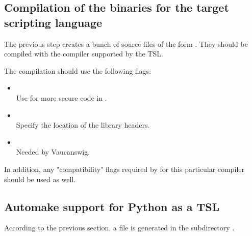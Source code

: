 \subsection{Compilation of the binaries for the target scripting language}

The previous step creates a bunch of \Cxx source files of the form
. They should be compiled with the
\Cxx compiler supported by the TSL.

The \Cxx compilation should use the following flags:

\begin{itemize}
\item {}\\
  Use for more secure code in \Vauc.

\item {}\\
  Specify the location of the \Vauc library headers.

\item {}\\
  Needed by Vaucanswig.
\end{itemize}

In addition, any "compatibility" flags required by \Vauc for this
particular \Cxx compiler should be used as well.


\subsection{Automake support for Python as a TSL}

According to the previous section, a  file is
generated in the subdirectory .

